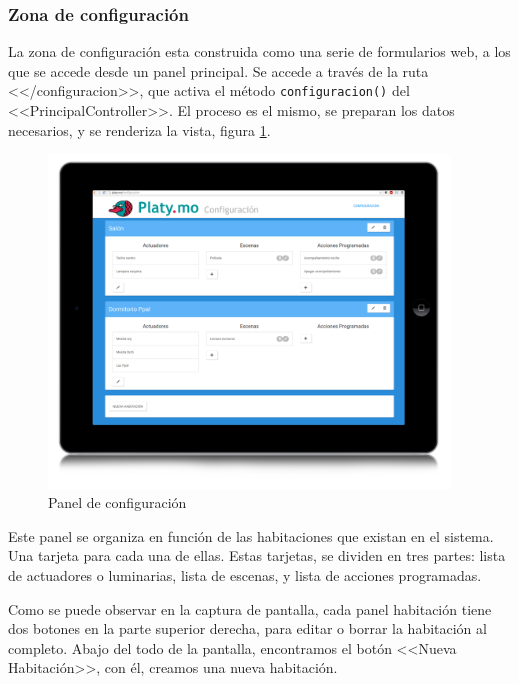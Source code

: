    
    \subsubsection{Zona de configuración}
    
    La zona de configuración esta construida como una serie de formularios web, a los que se accede desde un panel principal. Se accede a través de la ruta <</configuracion>>, que activa el método \lstinline|configuracion()| del <<PrincipalController>>. El proceso es el mismo, se preparan los datos necesarios, y se renderiza la vista, figura \ref{fig:panel_config}.
    
     \begin{figure}[htbp]
         \centering
         \includegraphics[width=0.95\textwidth]{imagenes/panel_config.jpg}
         \caption{Panel de configuración}
         \label{fig:panel_config}
        \end{figure}
        
    Este panel se organiza en función de las habitaciones que existan en el sistema. Una tarjeta para cada una de ellas. Estas tarjetas, se dividen en tres partes: lista de actuadores o luminarias, lista de escenas, y lista de acciones programadas.
    
    Como se puede observar en la captura de pantalla, cada panel habitación tiene dos botones en la parte superior derecha, para editar o borrar la habitación al completo. Abajo del todo de la pantalla, encontramos el botón <<Nueva Habitación>>, con él, creamos una nueva habitación. 
    

